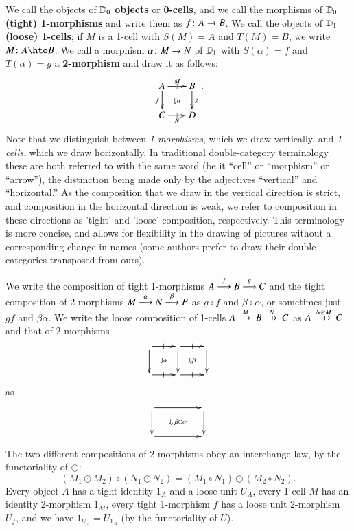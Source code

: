 We call the objects of $\lD_0$ \textbf{objects} or \textbf{0-cells},
and we call the morphisms of $\lD_0$ \textbf{(tight) 1-morphisms}
and write them as $f\maps A\to B$.  We call the objects of $\lD_1$
\textbf{(loose) 1-cells}; if $M$ is a 1-cell with $S(M)=A$ and
$T(M)=B$, we write $M\maps A\hto B$.  We call a morphism $\alpha\maps
M\to N$ of $\lD_1$ with $S(\alpha)=f$ and $T(\alpha)=g$ a
\textbf{2-morphism} and draw it as follows:
\begin{equation}\label{eq:square}
  \xymatrix@-.5pc{
    A \ar[r]|{|}^{M}  \ar[d]_f \ar@{}[dr]|{\Downarrow\alpha}&
    B\ar[d]^g\\
    C \ar[r]|{|}_N & D
  }.
\end{equation}
Note that we distinguish between \emph{1-morphisms}, which we draw
vertically, and \emph{1-cells}, which we draw horizontally.  In
traditional double-category terminology these are both referred to
with the same word (be it ``cell'' or ``morphism'' or ``arrow''), the
distinction being made only by the adjectives ``vertical'' and
``horizontal.'' As the composition that we draw in the vertical direction is strict, and composition in the horizontal direction is weak, we refer to composition in these directions as 'tight' and 'loose' composition, respectively. This terminology is more concise, and allows for
flexibility in the drawing of pictures without a corresponding change
in names (some authors prefer to draw their double categories
transposed from ours).

We write the composition of tight 1-morphisms $A\too[f] B\too[g] C$
and the tight composition of 2-morphisms $M\too[\alpha]
N\too[\beta] P$ as $g\circ f$ and $\beta\circ\alpha$, or sometimes
just $gf$ and $\beta\alpha$.  We write the loose composition of
1-cells $A\xhto{M} B \xhto{N} C$ as $A\xhto{N\odot M} C$ and that of
2-morphisms
\[\vcenter{\xymatrix{ \ar[r]|-@{|}^-{} \ar[d] \ar@{}[dr]|{\Downarrow\alpha} &
     \ar[r]|-@{|}^-{} \ar[d] \ar@{}[dr]|{\Downarrow\beta} &\ar[d]\\
  \ar[r]|-@{|}_-{} & \ar[r]|-@{|}_-{} & }}\]
as
\[\vcenter{\xymatrix@C=4pc{ \ar[r]|-@{|}^-{} \ar[d] \ar@{}[dr]|{\Downarrow\;\be\odot\al} &  \ar[d]\\
  \ar[r]|-@{|}_-{} & }}\]
The two different compositions of 2-morphisms obey an interchange law,
by the functoriality of $\odot$:
\[(M_1\odot M_2) \circ (N_1\odot N_2) = (M_1\circ N_1)\odot (M_2\circ N_2).
\]
Every object $A$ has a tight identity $1_A$ and a loose unit
$U_A$, every 1-cell $M$ has an identity 2-morphism $1_M$, every
tight 1-morphism $f$ has a loose unit 2-morphism $U_f$, and we
have $1_{U_A} = U_{1_A}$ (by the functoriality of $U$).

